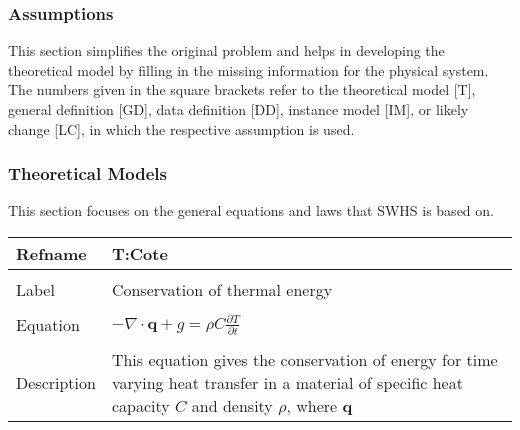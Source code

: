 \documentclass[12pt]{article}
\begin{document}
\subsubsection{Assumptions}
\label{Sec:As}
This section simplifies the original problem and helps in developing the theoretical model by filling in the missing information for the physical system. The numbers given in the square brackets refer to the theoretical model [T], general definition [GD], data definition [DD], instance model [IM], or likely change [LC], in which the respective assumption is used.
\subsubsection{Theoretical Models}
\label{Sec:TMs}
This section focuses on the general equations and laws that SWHS is based on.
~\newline
\noindent \begin{minipage}{\textwidth}
\begin{tabular}{p{} p{}}
\toprule \textbf{Refname} & \textbf{T:Cote}
\label{T:Cote}
\\ \midrule \\
Label & Conservation of thermal energy
\\ \midrule \\
Equation & $-\nabla{}\cdot{}\mathbf{q}+g=\rho{}C\frac{\partial{}T}{\partial{}t}$
\\ \midrule \\
Description & This equation gives the conservation of energy for time varying heat transfer in a material of specific heat capacity $C$ and density $\rho{}$, where $\mathbf{q}$
\\ \bottomrule \end{tabular}
\end{minipage}\\
\end{document}
